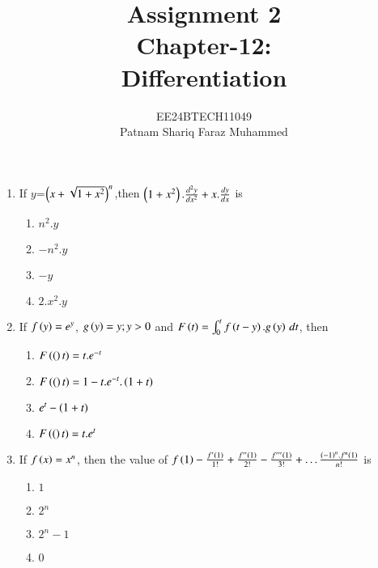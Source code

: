 \documentclass[journal,12pt,twocolumn]{IEEEtran}
\theoremstyle{remark}
\begin{document}


\title{Assignment 2 \\ Chapter-12: \\ Differentiation}
\author{EE24BTECH11049 \\ Patnam Shariq Faraz Muhammed}

\maketitle
\newpage
\bigskip

\begin{enumerate}

	\item
	{If $y$=$\left(x+\sqrt{1+x^{2}}\right)^{n}$,then $\left(1+x^{2}\right).\frac{d^{2}y}{dx^{2}} + x.\frac{dy}{dx}$ is}

	\hfill{}

	\begin{enumerate}
		\item $n^{2}.y$
		\item $-n^{2}.y$
		\item $-y$
		\item $2.x^{2}.y$
	\end{enumerate}

	\item
	If $f\left(y\right)=e^{y}$, $g\left(y\right)=y; y>0$ and $F\left(t\right)= \int_{0}^{t}{f\left(t-y\right).g\left(y\right) \, dt}$, then

	\hfill{}

	\begin{enumerate}
		\item $F\left((\right)t)=t.e^{-t}$
		\item $F\left((\right)t)=1-t.e^{-t}.\left(1+t\right)$
		\item $e^{t}-\left(1+t\right)$
		\item $F\left((\right)t)=t.e^{t}$
	\end{enumerate}

	\item 
		If $f\left(x\right)=x^{n}$, then the value of $f\left(1\right)-\frac{f^{\prime}\left(1\right)}{1!}+\frac{{f^{\prime\prime}\left(1\right)}}{2!}-\frac{{f^{\prime\prime\prime}\left(1\right)}}{3!}+\dots \frac{\left(-1\right)^n.f^{n}\left(1\right)}{n!}$ is

	\hfill{}
	
	\begin{enumerate}
		\item $1$
		\item $2^{n}$
		\item $2^{n}-1$
		\item $0$
	\end{enumerate}
	
\end{enumerate}
\end{document}
